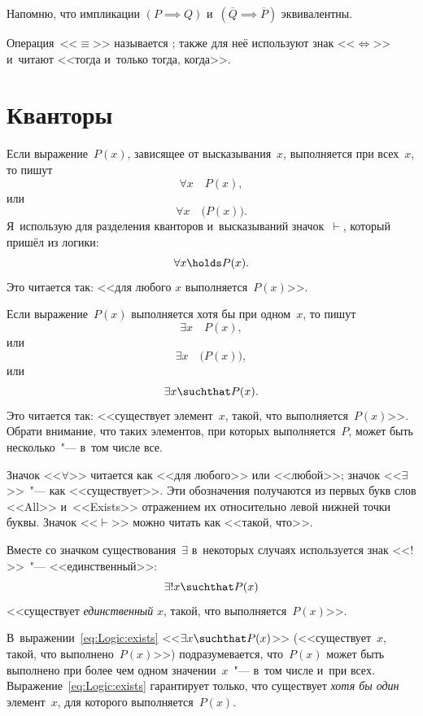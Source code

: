 \begin{note}
	Напомню, что импликации $(P \implies Q)$ и~$(\overline{Q} \implies \overline{P})$ эквивалентны.
\end{note}

\begin{note}
	Операция~<<$\equiv$>> называется ; также для неё используют знак <<$\Longleftrightarrow$>> и~читают <<тогда и~только тогда, когда>>.
\end{note}


\section{Кванторы}

Если выражение~$P(x)$, зависящее от высказывания~$x$, выполняется при всех~$x$, то пишут
\[
	\forall x
	\quad
	P(x)
	,
\]
или
\[
	\forall x
	\quad
	\bigl(
		P(x)
	\bigr)
	.
\]
Я~использую для разделения кванторов и~высказываний значок~$\vdash$, который пришёл из логики:
\begin{equation}
	\label{eq:Logic:forall}
	\forall x \holds P(x)
	.
\end{equation}
Это читается так: <<для любого $x$ выполняется~$P(x)$>>.

Если выражение~$P(x)$ выполняется хотя бы при одном~$x$, то пишут
\[
	\exists x 
	\quad
	P(x),
\]
или
\[
	\exists x
	\quad
	\bigl(
		P(x)
	\bigr)
	,
\]
или
\begin{equation}
	\label{eq:Logic:exists}
	\exists x
	\suchthat
	P(x)
	.
\end{equation}
Это читается так: <<существует элемент~$x$, такой, что выполняется~$P(x)$>>.
Обрати внимание, что таких элементов, при которых выполняется~$P$, может быть
несколько~"--- в~том числе все.

Значок <<$\forall$>> читается как <<для любого>> или <<любой>>; значок
<<$\exists$>>~"--- как <<существует>>. Эти обозначения получаются из первых букв
слов <<All>> и~<<Exists>> отражением их относительно левой нижней точки буквы.
Значок <<$\vdash$>> можно читать как <<такой, что>>.

Вместе со значком существования~$\exists$ в~некоторых случаях используется знак
<<$!$>>~"--- <<единственный>>:
\[
	\exists! x \suchthat P(x)
\]
<<существует \emph{единственный} $x$, такой, что выполняется~$P(x)$>>.

\begin{note}
	В~выражении~\eqref{eq:Logic:exists} <<$\exists x \suchthat P(x)$>>
	(<<существует~$x$, такой, что выполнено~$P(x)$>>) подразумевается, что~$P(x)$
	может быть выполнено при более чем одном значении~$x$~"--- в~том числе и~при
	всех. Выражение~\eqref{eq:Logic:exists} гарантирует только, что существует
	\emph{хотя бы один} элемент~$x$, для которого выполняется~$P(x)$.
\end{note}

